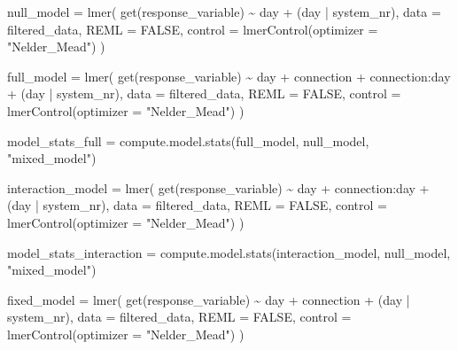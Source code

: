 \documentclass[
]{article}
\newenvironment{Shaded}{\begin{snugshade}}{\end{snugshade}}
\newcommand{\AttributeTok}[1]{\textcolor[rgb]{0.77,0.63,0.00}{#1}}
\newcommand{\ConstantTok}[1]{\textcolor[rgb]{0.00,0.00,0.00}{#1}}
\newcommand{\FunctionTok}[1]{\textcolor[rgb]{0.00,0.00,0.00}{#1}}
\newcommand{\NormalTok}[1]{#1}
\newcommand{\OtherTok}[1]{\textcolor[rgb]{0.56,0.35,0.01}{#1}}
\newcommand{\SpecialCharTok}[1]{\textcolor[rgb]{0.00,0.00,0.00}{#1}}
\newcommand{\StringTok}[1]{\textcolor[rgb]{0.31,0.60,0.02}{#1}}
\begin{document}
\begin{Shaded}
\begin{Highlighting}[]
\NormalTok{  null\_model }\OtherTok{=} \FunctionTok{lmer}\NormalTok{(}
    \FunctionTok{get}\NormalTok{(response\_variable) }\SpecialCharTok{\textasciitilde{}}
\NormalTok{      day }\SpecialCharTok{+}
\NormalTok{      (day }\SpecialCharTok{|}\NormalTok{ system\_nr),}
    \AttributeTok{data =}\NormalTok{ filtered\_data,}
    \AttributeTok{REML =} \ConstantTok{FALSE}\NormalTok{,}
    \AttributeTok{control =} \FunctionTok{lmerControl}\NormalTok{(}\AttributeTok{optimizer =} \StringTok{"Nelder\_Mead"}\NormalTok{)}
\NormalTok{  )}
  
\NormalTok{  full\_model }\OtherTok{=} \FunctionTok{lmer}\NormalTok{(}
    \FunctionTok{get}\NormalTok{(response\_variable) }\SpecialCharTok{\textasciitilde{}}
\NormalTok{      day }\SpecialCharTok{+}
\NormalTok{      connection }\SpecialCharTok{+}
\NormalTok{      connection}\SpecialCharTok{:}\NormalTok{day }\SpecialCharTok{+}
\NormalTok{      (day }\SpecialCharTok{|}\NormalTok{ system\_nr),}
    \AttributeTok{data =}\NormalTok{ filtered\_data,}
    \AttributeTok{REML =} \ConstantTok{FALSE}\NormalTok{,}
    \AttributeTok{control =} \FunctionTok{lmerControl}\NormalTok{(}\AttributeTok{optimizer =} \StringTok{"Nelder\_Mead"}\NormalTok{)}
\NormalTok{  )}
  
\NormalTok{  model\_stats\_full }\OtherTok{=} \FunctionTok{compute.model.stats}\NormalTok{(full\_model,}
\NormalTok{                                         null\_model,}
                                         \StringTok{"mixed\_model"}\NormalTok{)}
  
\NormalTok{  interaction\_model }\OtherTok{=} \FunctionTok{lmer}\NormalTok{(}
    \FunctionTok{get}\NormalTok{(response\_variable) }\SpecialCharTok{\textasciitilde{}}
\NormalTok{      day }\SpecialCharTok{+}
\NormalTok{      connection}\SpecialCharTok{:}\NormalTok{day }\SpecialCharTok{+}
\NormalTok{      (day }\SpecialCharTok{|}\NormalTok{ system\_nr),}
    \AttributeTok{data =}\NormalTok{ filtered\_data,}
    \AttributeTok{REML =} \ConstantTok{FALSE}\NormalTok{,}
    \AttributeTok{control =} \FunctionTok{lmerControl}\NormalTok{(}\AttributeTok{optimizer =} \StringTok{"Nelder\_Mead"}\NormalTok{)}
\NormalTok{  )}
  
\NormalTok{  model\_stats\_interaction }\OtherTok{=} \FunctionTok{compute.model.stats}\NormalTok{(interaction\_model,}
\NormalTok{                                                null\_model,}
                                                \StringTok{"mixed\_model"}\NormalTok{)}
  
\NormalTok{  fixed\_model }\OtherTok{=} \FunctionTok{lmer}\NormalTok{(}
    \FunctionTok{get}\NormalTok{(response\_variable) }\SpecialCharTok{\textasciitilde{}}
\NormalTok{      day }\SpecialCharTok{+}
\NormalTok{      connection }\SpecialCharTok{+}
\NormalTok{      (day }\SpecialCharTok{|}\NormalTok{ system\_nr),}
    \AttributeTok{data =}\NormalTok{ filtered\_data,}
    \AttributeTok{REML =} \ConstantTok{FALSE}\NormalTok{,}
    \AttributeTok{control =} \FunctionTok{lmerControl}\NormalTok{(}\AttributeTok{optimizer =} \StringTok{"Nelder\_Mead"}\NormalTok{)}
\NormalTok{  )}
  

\end{Highlighting}
\end{Shaded}
\end{document}
